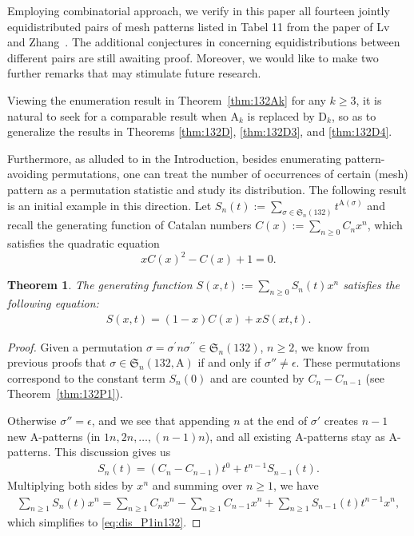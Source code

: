 \documentclass[12pt,reqno]{article}
\numberwithin{equation}{section}
\theoremstyle{plain}
\newtheorem{theorem}{Theorem}[section]
\theoremstyle{definition}
\def\fS{\mathfrak{S}}
\def\rA{\mathrm{A}}
\def\rD{\mathrm{D}}
\begin{document}
Employing combinatorial approach, we verify in this paper all fourteen jointly equidistributed pairs of mesh patterns listed in Tabel 11 from the paper of Lv and Zhang~\cite{LZ25}. The additional conjectures in \cite{LZ25} concerning equidistributions between different pairs are still awaiting proof. Moreover, we would like to make two further remarks that may stimulate future research.

Viewing the enumeration result in Theorem~\ref{thm:132Ak} for any $k\ge 3$, it is natural to seek for a comparable result when $\rA_k$ is replaced by $\rD_k$, so as to generalize the results in Theorems \ref{thm:132D}, \ref{thm:132D3}, and \ref{thm:132D4}.

Furthermore, as alluded to in the Introduction, besides enumerating pattern-avoiding permutations, one can treat the number of occurrences of certain (mesh) pattern as a permutation statistic and study its distribution. The following result is an initial example in this direction. Let $S_n(t):=\sum_{\sigma\in \fS_n(132)}t^{\rA(\sigma)}$ and recall the generating function of Catalan numbers $C(x):=\sum_{n\geq 0}C_nx^n$, which satisfies the quadratic equation $$xC(x)^2-C(x)+1=0.$$



\begin{theorem}\label{thm:dis_P1in132}
The generating function $S(x, t):=\sum_{n\geq 0}S_n(t)x^n$ satisfies the following equation:
\begin{align}\label{eq:dis_P1in132}
	S(x, t)=(1-x)C(x)+xS(xt, t).
\end{align}
\end{theorem}

\begin{proof}
	Given a permutation $\sigma=\sigma^{\prime}n\sigma^{\prime \prime}\in \fS_{n}(132)$, $n\ge 2$, we know from previous proofs that $\sigma\in\fS_n(132,\rA)$ if and only if $\sigma''\neq\epsilon$. These permutations correspond to the constant term $S_n(0)$ and are counted by $C_n-C_{n-1}$ (see Theorem~\ref{thm:132P1}).

	Otherwise $\sigma''=\epsilon$, and we see that appending $n$ at the end of $\sigma'$ creates $n-1$ new $\rA$-patterns (in $1n,2n,\ldots,(n-1)n$), and all existing $\rA$-patterns stay as $\rA$-patterns. This discussion gives us
	\begin{align*}
		S_n(t)=(C_n-C_{n-1})t^0+t^{n-1}S_{n-1}(t).
	\end{align*}
	Multiplying both sides by $x^n$ and summing over $n\geq 1$, we have
	\begin{align*}
		\sum_{n\geq 1}S_n(t)x^n=\sum_{n\geq 1}C_nx^n-\sum_{n\geq 1}C_{n-1}x^n+\sum_{n\geq 1}S_{n-1}(t)t^{n-1}x^n,
	\end{align*}
	which simplifies to \eqref{eq:dis_P1in132}.
\end{proof}
\end{document}
